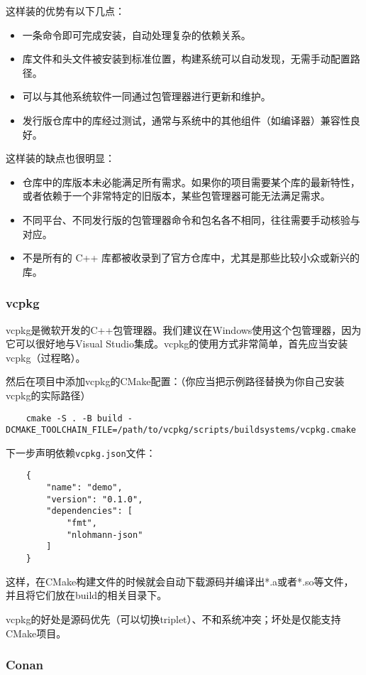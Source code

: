 这样装的优势有以下几点：
\begin{itemize}
  \item 一条命令即可完成安装，自动处理复杂的依赖关系。
  \item 库文件和头文件被安装到标准位置，构建系统可以自动发现，无需手动配置路径。
  \item 可以与其他系统软件一同通过包管理器进行更新和维护。
  \item 发行版仓库中的库经过测试，通常与系统中的其他组件（如编译器）兼容性良好。
\end{itemize}

这样装的缺点也很明显：
\begin{itemize}
  \item 仓库中的库版本未必能满足所有需求。如果你的项目需要某个库的最新特性，或者依赖于一个非常特定的旧版本，某些包管理器可能无法满足需求。
  \item 不同平台、不同发行版的包管理器命令和包名各不相同，往往需要手动核验与对应。
  \item 不是所有的 C++ 库都被收录到了官方仓库中，尤其是那些比较小众或新兴的库。
\end{itemize}

\subsubsection{vcpkg}

vcpkg是微软开发的C++包管理器。我们建议在Windows使用这个包管理器，因为它可以很好地与Visual Studio集成。vcpkg的使用方式非常简单，首先应当安装vcpkg（过程略）。

然后在项目中添加vcpkg的CMake配置：（你应当把示例路径替换为你自己安装vcpkg的实际路径）
\begin{lstlisting}
    cmake -S . -B build -DCMAKE_TOOLCHAIN_FILE=/path/to/vcpkg/scripts/buildsystems/vcpkg.cmake
\end{lstlisting}
下一步声明依赖\texttt{vcpkg.json}文件：
\begin{lstlisting}
    {
        "name": "demo",
        "version": "0.1.0",
        "dependencies": [
            "fmt",
            "nlohmann-json"
        ]
    }
\end{lstlisting}
这样，在CMake构建文件的时候就会自动下载源码并编译出*.a或者*.so等文件，并且将它们放在build的相关目录下。

vcpkg的好处是源码优先（可以切换triplet）、不和系统冲突；坏处是仅能支持CMake项目。

\subsubsection{Conan}

